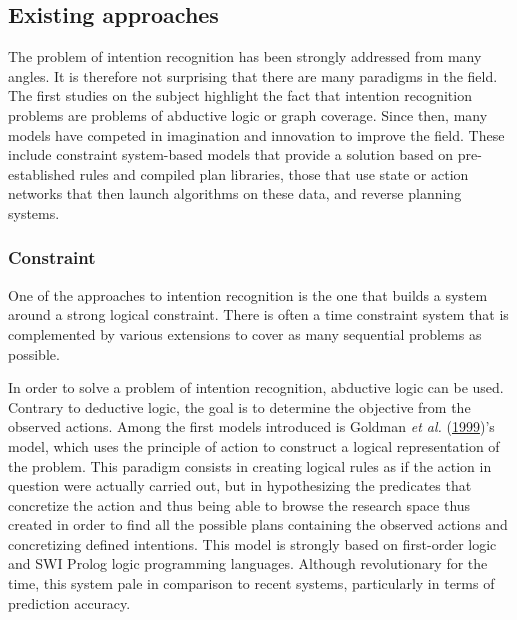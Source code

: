 \documentclass[11pt,a4paper,twoside,openright,titlepage,numbers=noenddot,headinclude,cleardoublepage=empty,openany]{scrreprt}
\theoremstyle{plain}
\theoremstyle{definition}
\theoremstyle{remark}
\begin{document}
\hypertarget{existing-approaches}{%
\subsection{Existing approaches}\label{existing-approaches}}

The problem of intention recognition has been strongly addressed from
many angles. It is therefore not surprising that there are many
paradigms in the field. The first studies on the subject highlight the
fact that intention recognition problems are problems of abductive logic
or graph coverage. Since then, many models have competed in imagination
and innovation to improve the field. These include constraint
system-based models that provide a solution based on pre-established
rules and compiled plan libraries, those that use state or action
networks that then launch algorithms on these data, and reverse planning
systems.

\hypertarget{constraint}{%
\subsubsection{Constraint}\label{constraint}}

One of the approaches to intention recognition is the one that builds a
system around a strong logical constraint. There is often a time
constraint system that is complemented by various extensions to cover as
many sequential problems as possible.

In order to solve a problem of intention recognition, abductive logic
can be used. Contrary to deductive logic, the goal is to determine the
objective from the observed actions. Among the first models introduced
is Goldman \emph{et al.}
(\protect\hyperlink{ref-goldman_new_1999}{1999})'s model, which uses the
principle of action to construct a logical representation of the
problem. This paradigm consists in creating logical rules as if the
action in question were actually carried out, but in hypothesizing the
predicates that concretize the action and thus being able to browse the
research space thus created in order to find all the possible plans
containing the observed actions and concretizing defined intentions.
This model is strongly based on first-order logic and SWI Prolog logic
programming languages. Although revolutionary for the time, this system
pale in comparison to recent systems, particularly in terms of
prediction accuracy.
\end{document}
